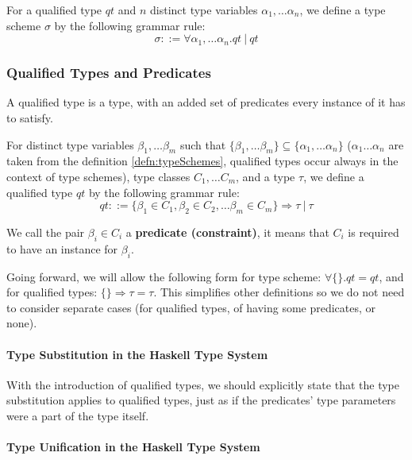 \begin{defn}
    For a qualified type $qt$ and $n$ distinct type variables $\alpha_1, \dots \alpha_n$, we define a type scheme $\sigma$ by the following grammar rule:
    \label{defn:typeSchemes}
    $$\sigma ::= \forall \alpha_1, \dots \alpha_n . qt\ |\ qt$$
\end{defn}

\subsubsection{Qualified Types and Predicates}

A qualified type is a type, with an added set of predicates every instance of it has to satisfy.

\begin{defn}
    For distinct type variables $\beta_1, \dots \beta_m$ such that $\{\beta_1, \dots \beta_m\} \subseteq \{\alpha_1, \dots \alpha_n\}$ ($\alpha_1 \dots \alpha_n$ are taken from the definition \ref{defn:typeSchemes}, qualified types occur always in the context of type schemes), type classes $C_1, \dots C_m$, and a type $\tau$, we define a qualified type $qt$ by the following grammar rule:
    $$qt ::= \{\beta_1 \in C_1, \beta_2 \in C_2, \dots \beta_m \in C_m\} \Rightarrow \tau\ |\ \tau$$

    We call the pair $\beta_i \in C_i$ a \textbf{predicate (constraint)}, it means that $C_i$ is required to have an instance for $\beta_i$.
\end{defn}

Going forward, we will allow the following form for type scheme: $\forall \{\}. qt = qt$, and for qualified types: $\{\} \Rightarrow \tau = \tau$. This simplifies other definitions so we do not need to consider separate cases (for qualified types, of having some predicates, or none).

\paragraph{Type Substitution in the Haskell Type System}

With the introduction of qualified types, we should explicitly state that the type substitution applies to qualified types, just as if the predicates' type parameters were a part of the type itself.

\paragraph{Type Unification in the Haskell Type System}

